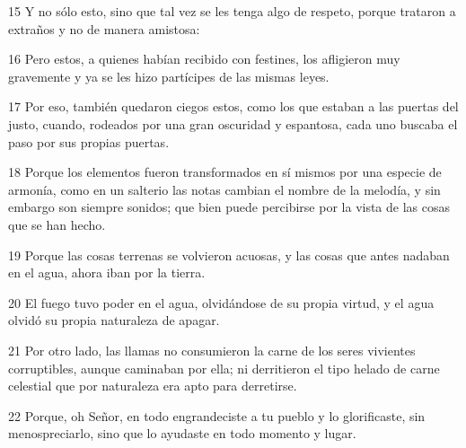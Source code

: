 \par 15 Y no sólo esto, sino que tal vez se les tenga algo de respeto, porque trataron a extraños y no de manera amistosa:
\par 16 Pero estos, a quienes habían recibido con festines, los afligieron muy gravemente y ya se les hizo partícipes de las mismas leyes.
\par 17 Por eso, también quedaron ciegos estos, como los que estaban a las puertas del justo, cuando, rodeados por una gran oscuridad y espantosa, cada uno buscaba el paso por sus propias puertas.
\par 18 Porque los elementos fueron transformados en sí mismos por una especie de armonía, como en un salterio las notas cambian el nombre de la melodía, y sin embargo son siempre sonidos; que bien puede percibirse por la vista de las cosas que se han hecho.
\par 19 Porque las cosas terrenas se volvieron acuosas, y las cosas que antes nadaban en el agua, ahora iban por la tierra.
\par 20 El fuego tuvo poder en el agua, olvidándose de su propia virtud, y el agua olvidó su propia naturaleza de apagar.
\par 21 Por otro lado, las llamas no consumieron la carne de los seres vivientes corruptibles, aunque caminaban por ella; ni derritieron el tipo helado de carne celestial que por naturaleza era apto para derretirse.
\par 22 Porque, oh Señor, en todo engrandeciste a tu pueblo y lo glorificaste, sin menospreciarlo, sino que lo ayudaste en todo momento y lugar.


